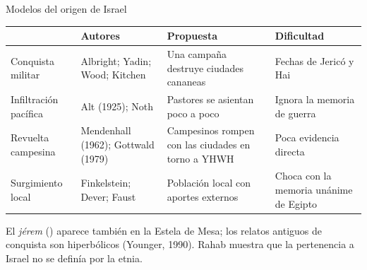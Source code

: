 \begin{frame}{Modelos del origen de Israel}
\centering\scriptsize\renewcommand{\arraystretch}{1.3}
\begin{tabular}{>{\RaggedRight\arraybackslash}p{2.2cm}>{\RaggedRight\arraybackslash}p{2.9cm}>{\RaggedRight\arraybackslash}p{3.3cm}>{\RaggedRight\arraybackslash}p{3.1cm}}
\toprule
{\color{ladrillo}\bfseries Modelo} & {\color{ladrillo}\bfseries Autores} & {\color{ladrillo}\bfseries Propuesta} & {\color{ladrillo}\bfseries Dificultad}\\\midrule
Conquista militar & Albright; Yadin; Wood; Kitchen & Una campaña destruye ciudades cananeas & Fechas de Jericó y Hai\\
Infiltración pacífica & Alt (1925); Noth & Pastores se asientan poco a poco & Ignora la memoria de guerra\\
Revuelta campesina & Mendenhall (1962); Gottwald (1979) & Campesinos rompen con las ciudades en torno a YHWH & Poca evidencia directa\\
Surgimiento local & Finkelstein; Dever; Faust & Población local con aportes externos & Choca con la memoria unánime de Egipto\\
\bottomrule
\end{tabular}
\elabpropia
\vspace{6pt}
\begin{notalam}
El \emph{jérem} () aparece también en la Estela de Mesa; los relatos antiguos de conquista son hiperbólicos (Younger, 1990). Rahab muestra que la pertenencia a Israel no se definía por la etnia.
\end{notalam}
\end{frame}

